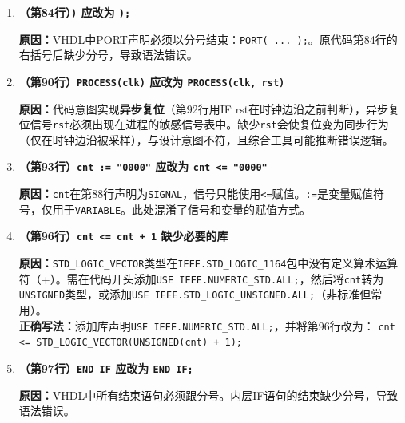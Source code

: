 \begin{enumerate}[label=\textbf{错误\arabic*：}]

\item \textbf{（第84行）\texttt{)} 应改为 \texttt{);}}

\textbf{原因：}VHDL中PORT声明必须以分号结束：\texttt{PORT( ... );}。原代码第84行的右括号后缺少分号，导致语法错误。

\item \textbf{（第90行）\texttt{PROCESS(clk)} 应改为 \texttt{PROCESS(clk, rst)}}

\textbf{原因：}代码意图实现\textbf{异步复位}（第92行用IF rst在时钟边沿之前判断），异步复位信号\texttt{rst}必须出现在进程的敏感信号表中。缺少\texttt{rst}会使复位变为同步行为（仅在时钟边沿被采样），与设计意图不符，且综合工具可能推断错误逻辑。

\item \textbf{（第93行）\texttt{cnt := "0000"} 应改为 \texttt{cnt <= "0000"}}

\textbf{原因：}\texttt{cnt}在第88行声明为\texttt{SIGNAL}，信号只能使用\texttt{<=}赋值。\texttt{:=}是变量赋值符号，仅用于\texttt{VARIABLE}。此处混淆了信号和变量的赋值方式。

\item \textbf{（第96行）\texttt{cnt <= cnt + 1} 缺少必要的库}

\textbf{原因：}\texttt{STD\_LOGIC\_VECTOR}类型在\texttt{IEEE.STD\_LOGIC\_1164}包中没有定义算术运算符（+）。需在代码开头添加\texttt{USE IEEE.NUMERIC\_STD.ALL;}，然后将\texttt{cnt}转为\texttt{UNSIGNED}类型，或添加\texttt{USE IEEE.STD\_LOGIC\_UNSIGNED.ALL;}（非标准但常用）。\\
\textbf{正确写法：}添加库声明\texttt{USE IEEE.NUMERIC\_STD.ALL;}，并将第96行改为：
\texttt{cnt <= STD\_LOGIC\_VECTOR(UNSIGNED(cnt) + 1);}

\item \textbf{（第97行）\texttt{END IF} 应改为 \texttt{END IF;}}

\textbf{原因：}VHDL中所有结束语句必须跟分号。内层IF语句的结束缺少分号，导致语法错误。

\end{enumerate}

